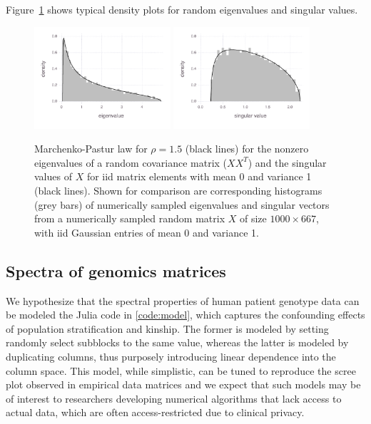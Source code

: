 \documentclass[final,leqno]{siamltex1213}
\begin{document}
Figure~\ref{fig:mplaw} shows typical density plots for random eigenvalues
and singular values.


\begin{figure}
\caption{Marchenko-Pastur law for $\rho=1.5$ (black lines) for the nonzero
eigenvalues of a random covariance matrix ($XX^{T}$) and the singular
values of $X$ for iid matrix elements with mean 0 and variance 1
(black lines). Shown for comparison are corresponding histograms (grey
bars) of numerically sampled eigenvalues and singular vectors from
a numerically sampled random matrix $X$ of size $1000\times667$,
with iid Gaussian entries of mean 0 and variance 1.
\label{fig:mplaw}
}

\includegraphics[width=0.45\textwidth]{fig/mplaw/fig-mplaw-ev}
%
\includegraphics[width=0.45\textwidth]{fig/mplaw/fig-mplaw-sv}
\end{figure}



\subsection{Spectra of genomics matrices}

We hypothesize that the spectral properties of human patient genotype data can
be modeled the Julia code in \ref{code:model}, which captures the confounding
effects of population stratification and kinship. The former is modeled by
setting randomly select subblocks to the same value, whereas the latter is
modeled by duplicating columns, thus purposely introducing linear dependence into
the column space. This model, while simplistic, can be tuned to reproduce the
scree plot observed in empirical data matrices and we expect that such models
may be of interest to researchers developing numerical algorithms that lack
access to actual data, which are often access-restricted due to clinical privacy.
\end{document}
